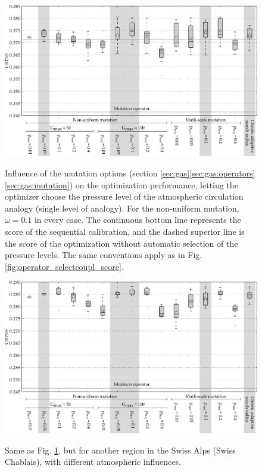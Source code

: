 \documentclass{ametsoc}
\begin{document}
\begin{figure}[t]
	\begin{center}
		\noindent\includegraphics[width=33pc,angle=0]{fig08.pdf}\\
	\end{center}
	\caption{Influence of the mutation options (section \ref{sec:gas}\ref{sec:gas:operators}\ref{sec:gas:mutation}) on the optimization performance, letting the optimizer choose the pressure level of the atmospheric circulation analogy (single level of analogy). For the non-uniform mutation, $\omega=0.1$ in every case. The continuous bottom line represents the score of the sequential calibration, and the dashed superior line is the score of the optimization without automatic selection of the pressure levels. The same conventions apply as in Fig. \ref{fig:operator_selectcoupl_score}.}
	\label{fig:operator_mutation_score_atmlevel}
\end{figure}

\begin{figure}[t]
	\begin{center}
		\noindent\includegraphics[width=33pc,angle=0]{fig09.pdf}\\
	\end{center}
	\caption{Same as Fig. \ref{fig:operator_mutation_score_atmlevel}, but for another region in the Swiss Alps (Swiss Chablais), with different atmospheric influences.}
	\label{fig:operator_mutation_score_rhoneamont}
\end{figure}
\end{document}
